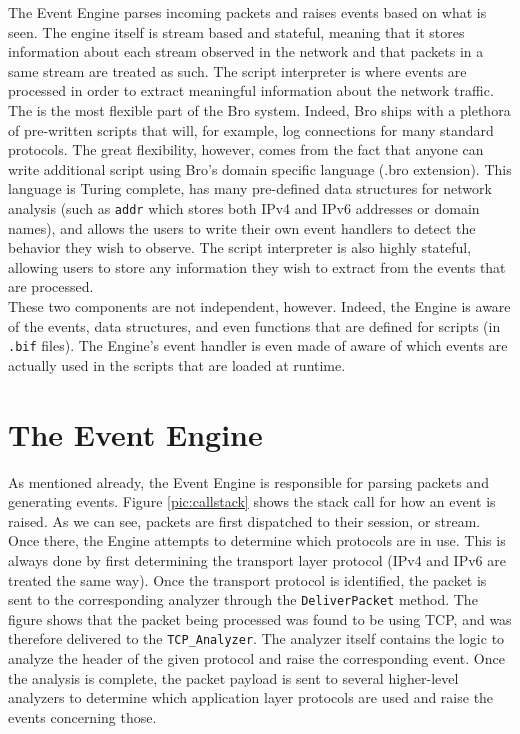 The Event Engine parses incoming packets and raises events based on what is seen. The engine itself is stream based and stateful, meaning that it stores information about each stream observed in the network and that packets in a same stream are treated as such. The script interpreter is where events are processed in order to extract meaningful information about the network traffic.\\

The is the most flexible part of the Bro system. Indeed, Bro ships with a plethora of pre-written scripts that will, for example, log connections for many standard protocols. The great flexibility, however, comes from the fact that anyone can write additional script using Bro's domain specific language (.bro extension). This language is Turing complete, has many pre-defined data structures for network analysis (such as \texttt{addr} which stores both IPv4 and IPv6 addresses or domain names), and allows the users to write their own event handlers to detect the behavior they wish to observe. The script interpreter is also highly stateful, allowing users to store any information they wish to extract from the events that are processed.\\

These two components are not independent, however. Indeed, the Engine is aware of the events, data structures, and even functions that are defined  for scripts (in \texttt{.bif} files). The Engine's event handler is even made of aware of which events are actually used in the scripts that are loaded at runtime.

\section{The Event Engine}
As mentioned already, the Event Engine is responsible for parsing packets and generating events. Figure \ref{pic:callstack} shows the stack call for how an event is raised. As we can see, packets are first dispatched to their session, or stream. Once there, the Engine attempts to determine which protocols are in use. This is always done by first determining the transport layer protocol (IPv4 and IPv6 are treated the same way). Once the transport protocol is identified, the packet is sent to the corresponding analyzer through the \texttt{DeliverPacket} method. The figure shows that the packet being processed was found to be using TCP, and was therefore delivered to the \texttt{TCP\_Analyzer}. The analyzer itself contains the logic to analyze the header of the given protocol and raise the corresponding event. Once the analysis is complete, the packet payload is sent to several higher-level analyzers to determine which application layer protocols are used and raise the events concerning those. \\

